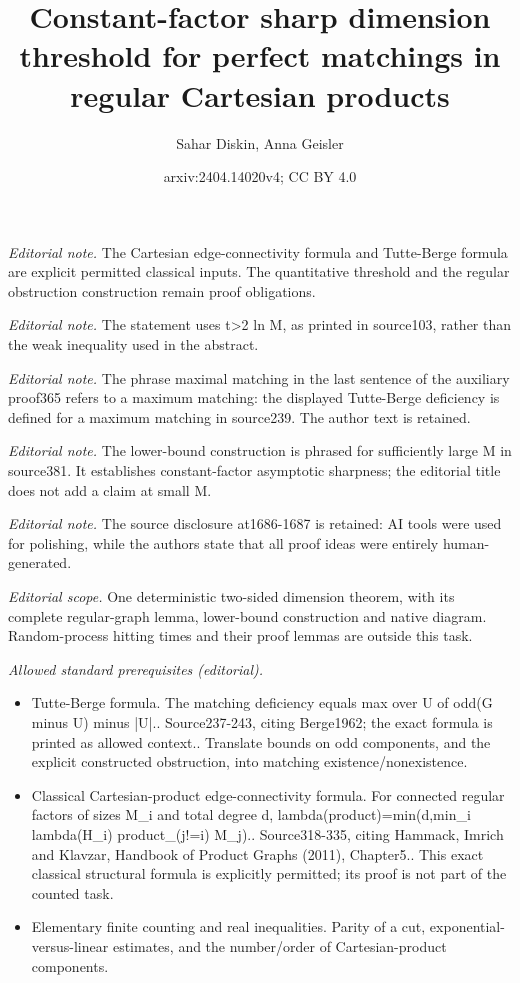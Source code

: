 \documentclass[10pt,a4paper]{article}
\title{Constant-factor sharp dimension threshold for perfect matchings in regular Cartesian products}
\author{Sahar Diskin, Anna Geisler}
\date{arxiv:2404.14020v4; CC BY 4.0}
\begin{document}
\maketitle
\noindent\textit{Editorial note.} The Cartesian edge-connectivity formula and Tutte-Berge formula are explicit permitted classical inputs. The quantitative threshold and the regular obstruction construction remain proof obligations.\par\medskip
\noindent\textit{Editorial note.} The statement uses t>2 ln M, as printed in source103, rather than the weak inequality used in the abstract.\par\medskip
\noindent\textit{Editorial note.} The phrase maximal matching in the last sentence of the auxiliary proof365 refers to a maximum matching: the displayed Tutte-Berge deficiency is defined for a maximum matching in source239. The author text is retained.\par\medskip
\noindent\textit{Editorial note.} The lower-bound construction is phrased for sufficiently large M in source381. It establishes constant-factor asymptotic sharpness; the editorial title does not add a claim at small M.\par\medskip
\noindent\textit{Editorial note.} The source disclosure at1686-1687 is retained: AI tools were used for polishing, while the authors state that all proof ideas were entirely human-generated.\par\medskip
\noindent\textit{Editorial scope.} One deterministic two-sided dimension theorem, with its complete regular-graph lemma, lower-bound construction and native diagram. Random-process hitting times and their proof lemmas are outside this task.\par\medskip
\noindent\textit{Allowed standard prerequisites (editorial).}\begin{itemize}
\item Tutte-Berge formula. The matching deficiency equals max over U of odd(G minus U) minus |U|.. Source237-243, citing Berge1962; the exact formula is printed as allowed context.. Translate bounds on odd components, and the explicit constructed obstruction, into matching existence/nonexistence.
\item Classical Cartesian-product edge-connectivity formula. For connected regular factors of sizes M\_i and total degree d, lambda(product)=min(d,min\_i lambda(H\_i) product\_(j!=i) M\_j).. Source318-335, citing Hammack, Imrich and Klavzar, Handbook of Product Graphs (2011), Chapter5.. This exact classical structural formula is explicitly permitted; its proof is not part of the counted task.
\item Elementary finite counting and real inequalities. Parity of a cut, exponential-versus-linear estimates, and the number/order of Cartesian-product components.
\end{itemize}\medskip
\end{document}
